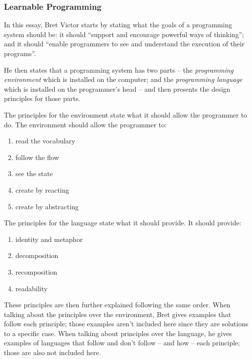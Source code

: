 \documentclass{./llncs2e/llncs}
\begin{document}
\subsubsection{Learnable Programming\cite{victor2012learnable}}
In this essay, Bret Victor starts by stating what the goals of a programming system should be: it should ``support and encourage powerful ways of thinking''; and it should ``enable programmers to see and understand the execution of their programs''.

He then states that a programming system has two parts -- the \emph{programming environment} which is installed on the computer; and the \emph{programming language} which is installed on the programmer's head -- and then presents the design principles for those parts.

The principles for the environment state what it should allow the programmer to do. The environment should allow the programmer to:
\begin{enumerate}
	\item \label{lp:env:read} read the vocabulary 
	\item \label{lp:env:flow} follow the flow
	\item \label{lp:env:state} see the state
	\item \label{lp:env:react} create by reacting
	\item \label{lp:env:abstr} create by abstracting
\end{enumerate}

The principles for the language state what it should provide. It should provide:
\begin{enumerate}
	\item \label{lp:lang:id} identity and metaphor
	\item \label{lp:lang:decom} decomposition
	\item \label{lp:lang:recom} recomposition
	\item \label{lp:lang:read} readability
\end{enumerate}

These principles are then further explained following the same order. When talking about the principles over the environment, Bret gives examples that follow each principle; those examples aren't included here since they are solutions to a specific case. When talking about principles over the language, he gives examples of languages that follow and don't follow -- and how -- each principle; those are also not included here.
\end{document}
